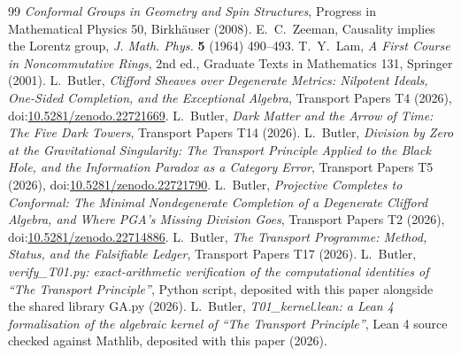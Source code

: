 \documentclass[11pt]{article}
\theoremstyle{definition}
\theoremstyle{plain}
\begin{document}
\begin{thebibliography}{99}
\emph{Conformal Groups in Geometry and Spin Structures},
Progress in Mathematical Physics 50, Birkh\"auser (2008).
 E.~C.~Zeeman,
Causality implies the Lorentz group,
\emph{J. Math. Phys.} \textbf{5} (1964) 490--493.
 T.~Y.~Lam,
\emph{A First Course in Noncommutative Rings}, 2nd ed.,
Graduate Texts in Mathematics 131, Springer (2001).
 L.~Butler,
\emph{Clifford Sheaves over Degenerate Metrics: Nilpotent Ideals, One-Sided Completion, and the Exceptional Algebra},
Transport Papers T4 (2026), doi:\href{https://doi.org/10.5281/zenodo.22721669}{10.5281/zenodo.22721669}.
 L.~Butler,
\emph{Dark Matter and the Arrow of Time: The Five Dark Towers},
Transport Papers T14 (2026).
 L.~Butler,
\emph{Division by Zero at the Gravitational Singularity: The Transport Principle Applied to the Black Hole, and the Information Paradox as a Category Error},
Transport Papers T5 (2026), doi:\href{https://doi.org/10.5281/zenodo.22721790}{10.5281/zenodo.22721790}.
 L.~Butler,
\emph{Projective Completes to Conformal: The Minimal Nondegenerate Completion of a Degenerate Clifford Algebra, and Where PGA's Missing Division Goes},
Transport Papers T2 (2026), doi:\href{https://doi.org/10.5281/zenodo.22714886}{10.5281/zenodo.22714886}.
 L.~Butler,
\emph{The Transport Programme: Method, Status, and the Falsifiable Ledger},
Transport Papers T17 (2026).
 L.~Butler,
\emph{verify\_T01.py: exact-arithmetic verification of the computational identities of ``The Transport Principle''},
Python script, deposited with this paper alongside the shared library GA.py (2026).
 L.~Butler,
\emph{T01\_kernel.lean: a Lean 4 formalisation of the algebraic kernel of ``The Transport Principle''},
Lean 4 source checked against Mathlib, deposited with this paper (2026).
\end{thebibliography}
\end{document}
